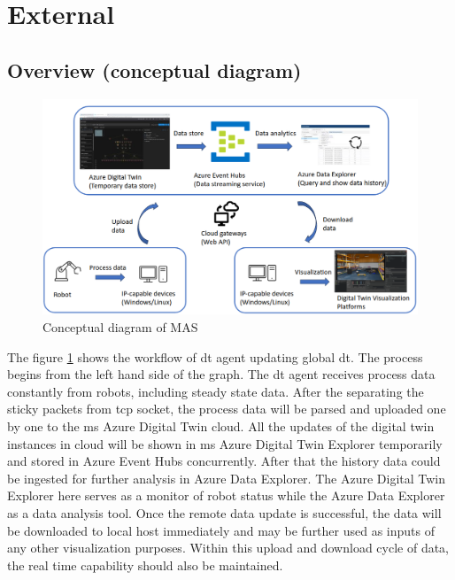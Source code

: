 \section{External}


\subsection{Overview (conceptual diagram)}

\begin{figure}[htb]
\includegraphics[width=\textwidth]{figures/DT_Conceptual_Diagram.png}

\centering
\caption{Conceptual diagram of MAS\label{fig: DTConceptual}}
\end{figure}

The figure \ref{fig: DTConceptual} shows the workflow of \gls{dt} agent updating global \gls{dt}.
The process begins from the left hand side of the graph. The \gls{dt} agent receives process data constantly from robots, including steady state data. 
After the separating the sticky packets from \gls{tcp} socket, the process data will be parsed and uploaded one by one to the \gls{ms} Azure Digital Twin cloud. 
All the updates of the digital twin instances in cloud will be shown in \gls{ms} Azure Digital Twin Explorer temporarily and stored in Azure Event Hubs concurrently. 
After that the history data could be ingested for further analysis in Azure Data Explorer. 
The Azure Digital Twin Explorer here serves as a monitor of robot status while the Azure Data Explorer as a data analysis tool. 
Once the remote data update is successful, the data will be downloaded to local host immediately and may be further used as inputs of any other visualization purposes. 
Within this upload and download cycle of data, the real time capability should also be maintained.  



